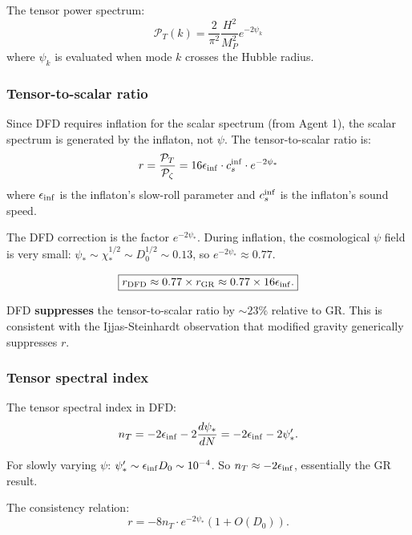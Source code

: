 \documentclass[11pt,a4paper]{article}
\begin{document}
The tensor power spectrum:
\begin{equation}
\mathcal{P}_T(k) = \frac{2}{\pi^2}\frac{H^2}{M_P^2}e^{-2\psi_k}
\end{equation}
where $\psi_k$ is evaluated when mode $k$ crosses the Hubble radius.

\subsubsection{Tensor-to-scalar ratio}

Since DFD requires inflation for the scalar spectrum (from Agent 1), the scalar spectrum is generated by the inflaton, not $\psi$. The tensor-to-scalar ratio is:
\begin{equation}
r = \frac{\mathcal{P}_T}{\mathcal{P}_\zeta} = 16\epsilon_{\rm inf} \cdot c_s^{\rm inf} \cdot e^{-2\psi_*}
\end{equation}
where $\epsilon_{\rm inf}$ is the inflaton's slow-roll parameter and $c_s^{\rm inf}$ is the inflaton's sound speed.

The DFD correction is the factor $e^{-2\psi_*}$. During inflation, the cosmological $\psi$ field is very small: $\psi_* \sim \chi_*^{1/2} \sim D_0^{1/2} \sim 0.13$, so $e^{-2\psi_*} \approx 0.77$.

\begin{equation}
\boxed{r_{\rm DFD} \approx 0.77 \times r_{\rm GR} \approx 0.77 \times 16\epsilon_{\rm inf}.}
\end{equation}

DFD \textbf{suppresses} the tensor-to-scalar ratio by $\sim 23\%$ relative to GR. This is consistent with the Ijjas-Steinhardt observation that modified gravity generically suppresses $r$.

\subsubsection{Tensor spectral index}

The tensor spectral index in DFD:
\begin{equation}
n_T = -2\epsilon_{\rm inf} - 2\frac{d\psi_*}{dN} = -2\epsilon_{\rm inf} - 2\psi_*'.
\end{equation}

For slowly varying $\psi$: $\psi_*' \sim \epsilon_{\rm inf} D_0 \sim 10^{-4}$. So $n_T \approx -2\epsilon_{\rm inf}$, essentially the GR result.

The consistency relation:
\begin{equation}
r = -8n_T \cdot e^{-2\psi_*}(1 + O(D_0)).
\end{equation}
\end{document}
